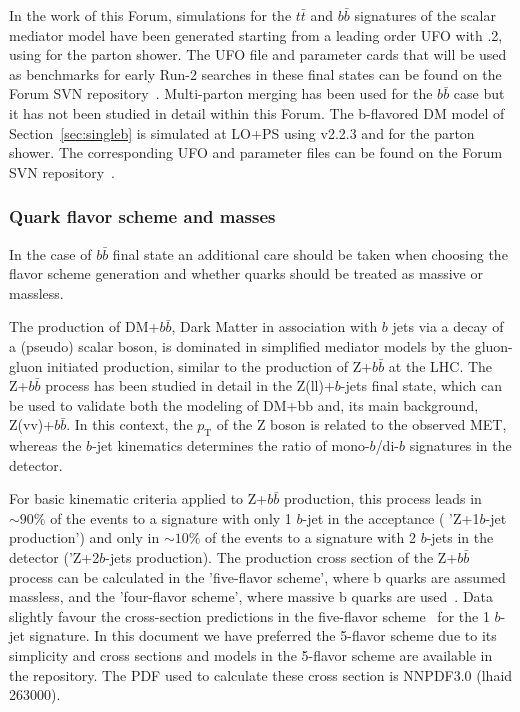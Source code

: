 In the work of this Forum, simulations for the $t \bar{t}$ and $b \bar{b}$ signatures of the scalar mediator model have been 
generated starting from a leading order UFO with .2, using \pythiaEight for the parton shower. 
The UFO file and parameter cards that will be used as benchmarks 
for early Run-2 searches in these final states can be found on the Forum SVN repository~\cite{ForumSVN_DMTTBar}.
Multi-parton merging has been used for the $b \bar{b}$ case but it has not been studied in detail within this Forum. 
The b-flavored DM model of Section~\ref{sec:singleb} is simulated at LO+PS using \madgraph v2.2.3 and \pythiaEight for the parton shower.  
The corresponding UFO and parameter files can be found on the Forum SVN repository~\cite{ForumSVN_DMSingleB}.

\subsubsection{Quark flavor scheme and masses}

In the case of $b \bar{b}$ final state an additional care should be taken when choosing the flavor scheme 
generation and whether quarks should be treated as massive or massless.

The production of DM+$b\bar{b}$, Dark Matter in association with $b$ jets via a decay of a (pseudo) scalar boson, 
is dominated in simplified mediator models by the gluon-gluon initiated production, similar to the production of 
Z+$b\bar{b}$ at the LHC. The Z+$b\bar{b}$ process has been studied in detail in the Z(ll)+$b$-jets final state,  
which can be used to validate both the modeling of DM+bb and, its main background, Z(vv)+$b\bar{b}$. 
In this context, the $p_\textrm{T}$ of the Z boson is related to the observed MET, whereas the $b$-jet kinematics 
determines the ratio of mono-$b$/di-$b$ signatures in the detector.


For basic kinematic criteria applied to Z+$b\bar{b}$ production, 
this process leads in $\sim90\%$ of the events to a signature with only 1 $b$-jet in the acceptance (
'Z+1$b$-jet production') and only in  $\sim10\%$ of the events to a signature with 2 $b$-jets in the detector ('Z+2$b$-jets production). 
The production cross section of the Z+$b\bar{b}$ process can be calculated in the 'five-flavor scheme', 
where b quarks are assumed massless, and the 'four-flavor scheme', where massive b quarks are 
used~\cite{Campbell:2003dd,Maltoni:2005wd,Campbell:2005zv}.
Data slightly favour the cross-section predictions in the five-flavor scheme~\cite{Chatrchyan:2014dha} for the 1 $b$-jet signature. 
In this document we have preferred the 5-flavor scheme due to its simplicity and 
cross sections and models in the 5-flavor scheme are available in the repository. 
The PDF used to calculate these cross section is NNPDF3.0 (lhaid 263000). 

